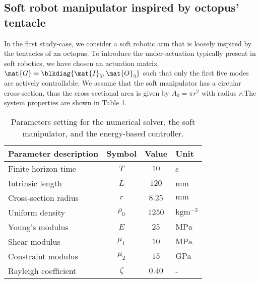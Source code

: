 \subsection{Soft robot manipulator inspired by octopus' tentacle}
In the first study-case, we consider a soft robotic arm that is loosely inspired by the tentacles of an octopus. To introduce the under-actuation typically present in soft robotics, we have chosen an actuation matrix $\mat{G} = \blkdiag{\mat{I}_5, \mat{O}_3}$ such that only the first five modes are actively controllable. \editl We assume that the soft manipulator has a circular cross-section, thus the cross-sectional area is given by $A_0 = \pi r^2$ with radius $r$.\editr The system properties are shown in Table \ref{tab:C3:parameters1}.
%
\begin{table}[t]
  \vspace{-0.25cm}
  \caption{Parameters setting for the numerical solver, the soft manipulator, and the energy-based controller.}\label{tab:C3:parameters1} \centering
  \begin{tabular}{l|c|c|l}
    Parameter description & Symbol & Value & Unit \\
    \midrule
    Finite horizon time & $T $ & $10$ & s \\
    Intrinsic length & $L $ & $ 120$ & mm \\
    Cross-section radius & $r $ & $ 8.25$ & $\text{mm}$ \\
    Uniform density & $\rho_0 $ & $ 1250$ & $\text{kg}\text{m}^{-3}$ \\
    Young's modulus & $E $ & $ 25$ & $\text{MPa}$ \\
    Shear modulus & $\mu_1 $ & $ 10 $ & $\text{MPa}$ \\
    Constraint modulus & $\mu_2 $ & $ 15 $ & $\text{GPa}$ \\
    Rayleigh coefficient & $\zeta $ & $ 0.40 $ & - \\
    \bottomrule
  \end{tabular}
  \vspace{-3mm}
  \end{table}
%

